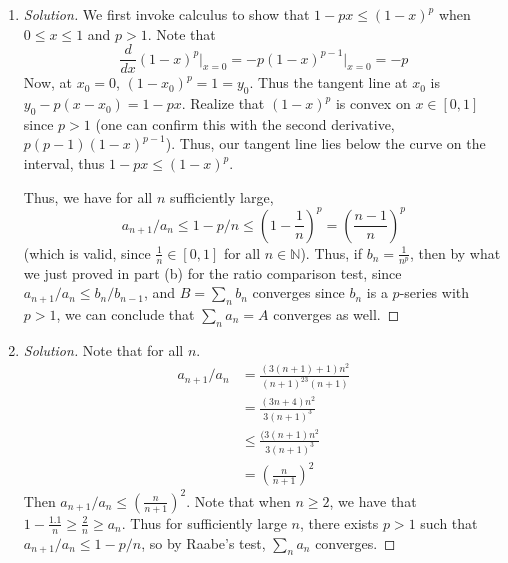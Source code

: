 \documentclass{article}
\newcommand{\N}{{\mathbb N}}
\newcommand{\ep}{{\varepsilon}}
\begin{document}
{\begin{enumerate}
\begin{proof}[Solution]
		It remains to show this is still true when $L = 0$.
		If $a_n/b_n \to 0$ as $n \to \infty$,
		then if $\ep = 1$,
		there exists some $N \in \N$ such that for all $n \geq N$,
		we have $\left|\frac{a_n}{b_n}\right| < 1$.
		But $\frac{a_n}{b_n} = \left|\frac{a_n}{b_n}\right|$,
		thus $0 < a_n = |a_n| < b_n$.
		Assume that series $B$ converges.
		Then $\lim_{n\to\infty}\sum_{k=N}^nb_n$ converges as well
		(all subsequences of a convergent sequence converge).
		Thus by the comparison test, $\sum_{k=N}^\infty a_k$ converges,
		thus $\sum_{k=1}^{N-1}a_k + \sum_{k=N}^\infty a_k = A$
		converges as well.

		Note that $a_{n+1}/a_n \leq b_n/b_{n-1}$ is also a valid
		statement too,
		since we can just reindex $b_n$ by bumping everything along by $1$,
		(say set $b'_n = b_{n-1}$ and $b'_1 = 1$).
		This doesn't alter the convergence of $B$ (ie. $\sum_n b'_n$ converges
		if and only if $\sum_n b_n = B$ converges),
		since we are just adding a finite term,
		thus, the Ratio Comparison test still holds.
	\end{proof}
	\item \begin{proof}[Solution]\let\qed\relax
		We first invoke calculus to show that $1 - px \leq (1-x)^p$
		when $0 \leq x \leq 1$ and $p > 1$.
		Note that
		\[
			\frac{d}{dx}(1-x)^p\vert_{x=0} = -p(1-x)^{p-1}\vert_{x=0} = -p
		\]
		Now, at $x_0 = 0$, $(1-x_0)^p = 1 = y_0$.
		Thus the tangent line at $x_0$ is $y_0 - p(x-x_0) = 1-px$.
		Realize that $(1-x)^p$ is convex on $x \in [0,1]$
		since $p > 1$
		(one can confirm this with the second derivative, $p(p-1)(1-x)^{p-1}$).
		Thus, our tangent line lies below the curve on the interval,
		thus $1-px \leq (1-x)^p$.

		Thus, we have for all $n$ sufficiently large,
		\[
			a_{n+1}/a_n \leq 1-p/n \leq (1-\frac{1}{n})^p = \left(\frac{n-1}{n}\right)^p
		\]
		(which is valid, since $\frac{1}{n} \in [0,1]$ for all $n \in \N$).
		Thus, if $b_n = \frac{1}{n^p}$,
		then by what we just proved in part (b) for the ratio comparison test,
		since $a_{n+1}/a_n \leq b_n/b_{n-1}$,
		and $B = \sum_{n}b_n$ converges since $b_n$
		is a $p$-series with $p > 1$,
		we can conclude that $\sum_n a_n = A$ converges as well.
	\end{proof}
	\item \begin{proof}[Solution]\let\qed\relax
		Note that for all $n$.
		\begin{align*}
			a_{n+1}/a_n
			&= \frac{(3(n+1)+1)n^2}{(n+1)^23(n+1)}\\
			&= \frac{(3n+4)n^2}{3(n+1)^3}\\
			&\leq \frac{(3(n+1)n^2}{3(n+1)^3}\\
			&= \left(\frac{n}{n+1}\right)^2
		\end{align*}
		Then $a_{n+1}/a_n \leq \left(\frac{n}{n+1}\right)^2$.
		Note that when $n \geq 2$,
		we have that $1 - \frac{1.1}{n} \geq \frac{2}{n} \geq a_n$.
		Thus for sufficiently large $n$,
		there exists $p > 1$
		such that $a_{n+1}/a_n \leq 1-p/n$,
		so by Raabe's test, $\sum_na_n$ converges.
	\end{proof}
\end{enumerate}
\clearpage

}
\end{document}
